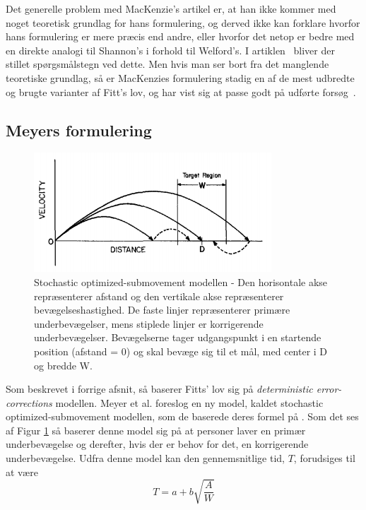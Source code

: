 Det generelle problem med MacKenzie's artikel er, at han ikke kommer med noget teoretisk grundlag for hans formulering, og derved ikke kan forklare hvorfor hans formulering er mere præcis end andre, eller hvorfor det netop er bedre med en direkte analogi til Shannon's i forhold til Welford's. I artiklen~\cite{drewes2010} bliver der stillet spørgsmålstegn ved dette. Men hvis man ser bort fra det manglende teoretiske grundlag, så er MacKenzies formulering stadig en af de mest udbredte og brugte varianter af Fitt's lov, og har vist sig at passe godt på udførte forsøg~\cite{goldberg2015}.

\subsection*{Meyers formulering}
\begin{figure}[h]
\centering
\includegraphics[width=.5\linewidth]{images/illustrations/base_model_meyer}
\caption{Stochastic optimized-submovement modellen - Den horisontale akse repræsenterer afstand og den vertikale akse repræsenterer bevægelseshastighed. De faste linjer repræsenterer primære underbevægelser, mens stiplede linjer er korrigerende underbevægelser. Bevægelserne tager udgangspunkt i en startende position (afstand = 0) og skal bevæge sig til et mål, med center i D og bredde W.}
\label{fig:MeyerTheory}
\end{figure}
Som beskrevet i forrige afsnit, så baserer Fitts' lov sig på \emph{deterministic error-corrections} modellen. Meyer et al. foreslog en ny model, kaldet stochastic optimized-submovement modellen, som de baserede deres formel på \cite{meyer1988}. Som det ses af Figur \ref{fig:MeyerTheory} så baserer denne model sig på at personer laver en primær underbevægelse og derefter, hvis der er behov for det, en korrigerende underbevægelse. Udfra denne model kan den gennemsnitlige tid, $T$, forudsiges til at være
\begin{equation}
\label{eq:meyer}
T = a + b \sqrt{\frac{A}{W}}
\end{equation}

